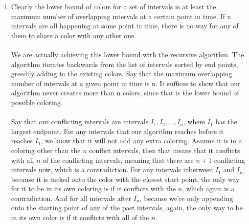 \begin{enumerate}
\begin{enumerate}
        \item
          Clearly the lower bound of colors for a set of intervals is at least the maximum number of overlapping intervals at a certain point in time. If n intervals are all happening at some point in time, there is no way for any of them to share a color with any other one.\\\\
          We are actually achieving this lower bound with the recursive algorithm. The algorithm iterates backwards from the list of intervals sorted by end points, greedily adding to the existing colors. Say that the maximum overlapping number of intervals at a given point in time is n. It suffices to show that our algorithm never creates more than n colors, since that is the lower bound of possible coloring.\\\\
          Say that our conflicting intervals are intervals $I_1,I_2,\ldots,I_n$, where $I_1$ has the largest endpoint. For any intervals that our algorithm reaches before it reaches $I_1$, we know that it will not add any extra coloring. Assume it is in a coloring other than the $n$ conflict intervals, then that means that it conflicts with all $n$ of the conflicting intervals, meaning that there are $n+1$ conflicting intervals now, which is a contradiction. For any intervals inbetween $I_1$ and $I_n$, because it is tacked onto the color with the closest start point, the only way for it to be in its own coloring is if it conflicts with the $n$, which again is a contradiction. And for all intervals after $I_n$, because we're only appending onto the starting point of any of the past intervals, again, the only way to be in its own color is if it conflicts with all of the $n$.
          
    \end{enumerate}
  

\end{enumerate}

